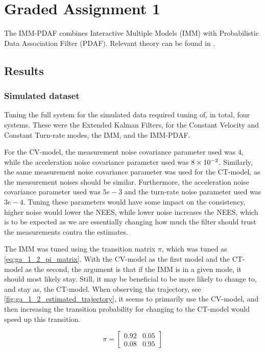 \section{Graded Assignment 1}\label{sec:graded_assignment_1}
The IMM-PDAF combines Interactive Multiple Models (IMM) with Probabilistic Data Association Filter (PDAF). Relevant theory can be found in \cite[p. 100-101, 120 - 122]{Edmund}. 

\subsection*{Results}
\subsubsection*{Simulated dataset}
Tuning the full system for the simulated data required tuning of, in total, four systems. These were the Extended Kalman Filters, for the Constant Velocity and Constant Turn-rate modes, the IMM, and the IMM-PDAF. 

For the CV-model, the measurement noise covariance parameter used was $4$, while the acceleration noise covariance parameter used was ${8} \times 10^{-2}$. Similarly, the same measurement noise covariance parameter was used for the CT-model, as the measurement noises should be similar. Furthermore, the acceleration noise covariance parameter used was $5e-3$ and the turn-rate noise parameter used was $3e-4$. Tuning these parameters would have some impact on the consistency, higher noise would lower the NEES, while lower noise increases the NEES, which is to be expected as we are essentially changing how much the filter should trust the measurements contra the estimates. 

The IMM was tuned using the transition matrix $\pi$, which was tuned as \cref{eq:ga_1_2_pi_matrix}. With the CV-model as the first model and the CT-model as the second, the argument is that if the IMM is in a given mode, it should most likely stay. Still, it may be beneficial to be more likely to change to, and stay as, the CT-model. When observing the trajectory, see \cref{fig:ga_1_2_estimated_trajectory}, it seems to primarily use the CV-model, and then increasing the transition probability for changing to the CT-model would speed up this transition. 

\begin{equation}
    \label{eq:ga_1_2_pi_matrix}
    \pi = \begin{bmatrix}
        0.92 & 0.05 \\
        0.08 & 0.95
    \end{bmatrix}
\end{equation}


